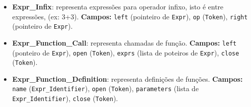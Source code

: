 \begin{itemize}
  \item \textbf{Expr\_Infix}: representa expressões para operador infixo, isto é entre expressões, (ex: 3+3).
      \textbf{Campos:}
        \texttt{left} (pointeiro de \texttt{Expr}), \texttt{op} (\texttt{Token}), \texttt{right} (pointeiro de \texttt{Expr}).

\item \textbf{Expr\_Function\_Call}: representa chamadas de função.
      \textbf{Campos:}
      \texttt{left} (ponteiro de \texttt{Expr}), \texttt{open} (\texttt{Token}),
      \texttt{exprs} (lista de poteiros de \texttt{Expr}), \texttt{close} (\texttt{Token}).

\item \textbf{Expr\_Function\_Definition}: representa definições de funções.
      \textbf{Campos:}
      \texttt{name} (\texttt{Expr\_Identifier}), \texttt{open} (\texttt{Token}),
      \texttt{parameters} (lista de \texttt{Expr\_Identifier}), \texttt{close} (\texttt{Token}).
\end{itemize}





